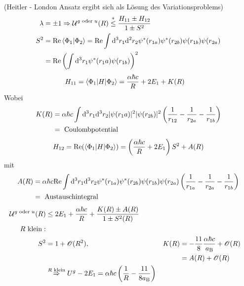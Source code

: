 (Heitler - London Ansatz ergibt sich als Lösung des Variationsproblems)
	\begin{align*}
		\lambda &= \pm 1 \Rightarrow \mathcal{U}^{g \text{ oder }u} (R) 
		\overset{*}{\leq} \frac{H_{11} \pm H_{12}}{1 \pm S^2} \\
		S^2 &= \mathrm{Re}\braket{\Phi_1 | \Phi_2} 
		= \mathrm{Re} \int \mathrm{d}^3 r_1 \mathrm{d}^2 r_2 \psi^* (r_{1a}) \psi^* (r_{2b}) \psi(r_{1b}) \psi (r_{2a}) \\
		&= \mathrm{Re} \left(\int \mathrm{d}^3 r_1 \psi^*(r_1a) \psi (r_{1b})\right)^2 \\
	\end{align*}
	\begin{align*}
		H_{11} &= \braket{\Phi_1 | H | \Phi_2} =
		\frac{\alpha \hbar c}{R} + 2 E_1 + K(R)
	\end{align*}
Wobei 
	\begin{align*}
		K(R) &= \alpha \hbar c \int \mathrm{d}^3 r_1 \mathrm{d}^3 r_2 |\psi (r_1a)|^2 
		|\psi (r_{2b})|^2 \left(\frac{1}{r_{12}} - \frac{1}{r_{2a}} - \frac{1}{r_{1b}}\right) \\
		&= \text{ Coulombpotential}
	\end{align*}
	\begin{align*}
		H_{12} = \mathrm{Re} (\braket{\Phi_1 | H | \Phi_2}) 
		= \left(\frac{\alpha \hbar c}{R} + 2 E_1\right) S^2 + A(R) 
	\end{align*}
mit 
	\begin{align*}
		A(R) &= \alpha \hbar c \mathrm{Re} \int \mathrm{d}^3 r_1 \mathrm{d}^3 r_2 \psi^* (r_{1a}) \psi^* (r_{2b}) \psi(r_{1b}) \psi (r_{2a}) \left(\frac{1}{r_{1a}} - \frac{1}{r_{2a}} - \frac{1}{r_{1b}}\right)\\
		&= \text{ Austauschintegral}
	\end{align*}
	\begin{align*}
		\mathcal{U}^{g \text{ oder }u} (R) &\leq 2 E_1 + \frac{\alpha \hbar c}{R} + 
		\frac{K(R) \pm A(R)}{1 \pm S^2(R)} \\
		R \text{ klein}:& \\
		S^2 &= 1 + \mathscr{O} (R^2) ,&
		K(R) &= - \frac{11}{8} \frac{\alpha \hbar c}{a_{\mathrm{B}}} + \mathscr{O} (R) \\
		& & &= A(R) + \mathscr{O} (R)\\
		&\overset{R \text{ klein}}{\Rightarrow} U^g - 2E_1 = \alpha \hbar c 
		\left(\frac{1}{R} - \frac{11}{8 a_{\mathrm{B}}}\right) 
	\end{align*}
